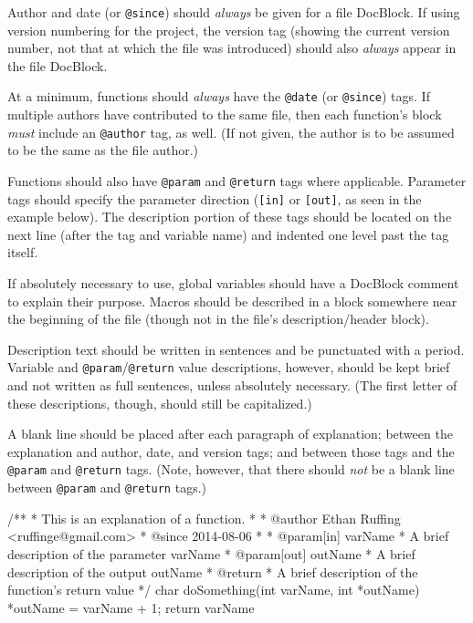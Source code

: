 \documentclass[11pt]{book}
\begin{document}
Author and date (or \texttt{@since}) should \emph{always} be given for a
file DocBlock. If using version numbering for the project, the version
tag (showing the current version number, not that at which the file was
introduced) should also \emph{always} appear in the file DocBlock.

At a minimum, functions should \emph{always} have the \texttt{@date} (or
\texttt{@since}) tags. If multiple authors have contributed to the same
file, then each function's block \emph{must} include an \texttt{@author}
tag, as well. (If not given, the author is to be assumed to be the same
as the file author.)

Functions should also have \texttt{@param} and \texttt{@return} tags
where applicable. Parameter tags should specify the parameter direction
(\texttt{{[}in{]}} or \texttt{{[}out{]}}, as seen in the example below).
The description portion of these tags should be located on the next line
(after the tag and variable name) and indented one level past the tag
itself.

If absolutely necessary to use, global variables should have a DocBlock
comment to explain their purpose. Macros should be described in a block
somewhere near the beginning of the file (though not in the file's
description/header block).

Description text should be written in sentences and be punctuated with a
period. Variable and \texttt{@param}/\texttt{@return} value
descriptions, however, should be kept brief and not written as full
sentences, unless absolutely necessary. (The first letter of these
descriptions, though, should still be capitalized.)

A blank line should be placed after each paragraph of explanation;
between the explanation and author, date, and version tags; and between
those tags and the \texttt{@param} and \texttt{@return} tags. (Note,
however, that there should \emph{not} be a blank line between
\texttt{@param} and \texttt{@return} tags.)

\begin{code}[caption=Example of Doxygen comments.,label=lst:doxygen-example]
/**
 * This is an explanation of a function.
 *
 * @author Ethan Ruffing <ruffinge@gmail.com>
 * @since 2014-08-06
 *
 * @param[in] varName
 *     A brief description of the parameter varName
 * @param[out] outName
 *     A brief description of the output outName
 * @return
 *     A brief description of the function's return value
 */
char doSomething(int varName, int *outName) {
    *outName = varName + 1;
    return varName %
}
\end{code}
\end{document}
